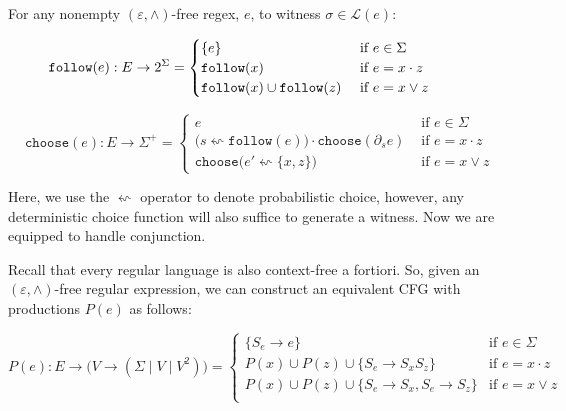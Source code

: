 \documentclass[sigplan,acmsmall,nonacm,screen]{acmart}\settopmatter{printfolios=false,printccs=false,printacmref=false}
\begin{document}
\begin{theorem}[Generation]\label{thm:generation}
  For any nonempty $(\varepsilon, \land)$-free regex, \(e\), to witness $\sigma \in \mathcal{L}(e)$:

\begin{equation}
  \hspace{-1cm}\texttt{follow}(e): E \rightarrow 2^\Sigma = \begin{cases}
   \{e\} &\text{ if } e \in \Sigma \\
   \texttt{follow}(x) &\text{ if } e = x \cdot z\\
   \texttt{follow}(x)\cup\texttt{follow}(z) &\text{ if } e = x \lor z
  \end{cases}
\end{equation}

\begin{equation}\label{eq:choose}
  \texttt{choose}(e): E \rightarrow \Sigma^+ = \begin{cases}
   e &\text{ if } e \in \Sigma \\
   \big(s \leftsquigarrow \texttt{follow}(e)\big)\cdot \texttt{choose}(\partial_s e) &\text{ if } e = x \cdot z\\
   \texttt{choose}\big(e' \leftsquigarrow \{x, z\}\big) &\text{ if } e = x \lor z
  \end{cases}
\end{equation}
\end{theorem}

Here, we use the $\leftsquigarrow$ operator to denote probabilistic choice, however, any deterministic choice function will also suffice to generate a witness. Now we are equipped to handle conjunction.

Recall that every regular language is also context-free a fortiori. So, given an $(\varepsilon, \land)$-free regular expression, we can construct an equivalent CFG with productions $P(e)$ as follows:

\begin{equation}
P(e): E \rightarrow \big(V \rightarrow (\Sigma \mid V \mid V^2)\big) = \begin{cases}
 \{ S_e \rightarrow e \} & \text{if } e \in \Sigma \\
 P(x) \cup P(z) \cup \{ S_e \rightarrow S_x S_z \} & \text{if } e = x \cdot z \\
 P(x) \cup P(z) \cup \{ S_e \rightarrow S_x, S_e \rightarrow S_z \} & \text{if } e = x \lor z \\
\end{cases}
\end{equation}\vspace{0.2cm}
\end{document}
